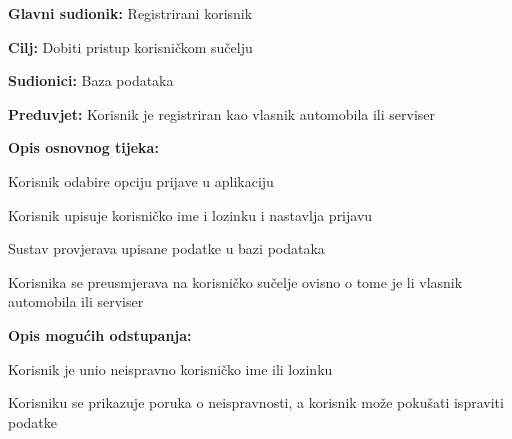 \noindent {}
\begin{packed_item}
	
	\item \textbf{Glavni sudionik: } Registrirani korisnik
	\item  \textbf{Cilj:} Dobiti pristup korisničkom sučelju
	\item  \textbf{Sudionici:} Baza podataka
	\item  \textbf{Preduvjet:} Korisnik je registriran kao vlasnik automobila
	ili serviser
	\item  \textbf{Opis osnovnog tijeka:}
	
	\item[] \begin{packed_enum}
		
		\item Korisnik odabire opciju prijave u aplikaciju
		\item Korisnik upisuje korisničko ime i lozinku i nastavlja prijavu
		\item Sustav provjerava upisane podatke u bazi podataka
		\item Korisnika se preusmjerava na korisničko sučelje ovisno o tome je li
		vlasnik automobila ili serviser
	\end{packed_enum}
	
	\item  \textbf{Opis mogućih odstupanja:}
	
	\item[] \begin{packed_item}
		
		\item[3.a] Korisnik je unio neispravno korisničko ime ili lozinku
		\item[] \begin{packed_enum}
			
			\item Korisniku se prikazuje poruka o neispravnosti, a korisnik može
			pokušati ispraviti podatke
			
		\end{packed_enum}
		
	\end{packed_item}
\end{packed_item}

